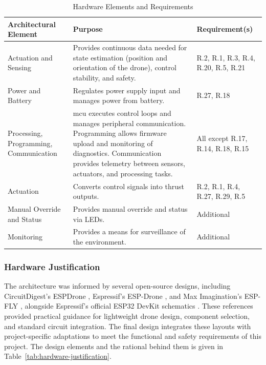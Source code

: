 \begin{table}[H]
\centering
\caption{Hardware Elements and Requirements}
\label{tab:hardware-arch}
\begin{tabular}{|m{}|m{}|m{}|}
\hline
\rowcolor{gray!15}
\textbf{Architectural Element} & \textbf{Purpose} & \textbf{Requirement(s)} \\
\hline
Actuation and Sensing & Provides continuous data needed for state estimation (position and orientation of the drone), control stability, and safety. & R.2, R.1, R.3, R.4, R.20, R.5, R.21 \\
\hline
Power and Battery  & Regulates power supply input and manages power from battery. & R.27, R.18 \\
\hline
Processing, Programming, Communication & \gls{mcu} executes control loops and manages peripheral communication. \newline
Programming allows firmware upload and monitoring of diagnostics. \newline
Communication provides telemetry between sensors, actuators, and processing tasks. & All except R.17, R.14, R.18, R.15 \\
\hline
Actuation & Converts control signals into thrust outputs. & R.2, R.1, R.4, R.27, R.29, R.5 \\
\hline
Manual Override and Status & Provides manual override and status via LEDs. & Additional \\
\hline
Monitoring & Provides a means for surveillance of the environment. & Additional \\
\hline
\end{tabular}
\end{table}

\subsubsection{Hardware Justification}

The architecture was informed by several open-source designs, including CircuitDigest’s ESPDrone \cite{espdrone_circuitdigest}, Espressif’s ESP-Drone \cite{espdrone_espressif}, and Max Imagination’s ESP-FLY \cite{maximagination}, alongside Espressif’s official ESP32 DevKit schematics \cite{espressif_devkits}. These references provided practical guidance for lightweight drone design, component selection, and standard circuit integration. The final design integrates these layouts with project-specific adaptations to meet the functional and safety requirements of this project. The design elements and the rational behind them is given in Table~\ref{tab:hardware-justification}.

